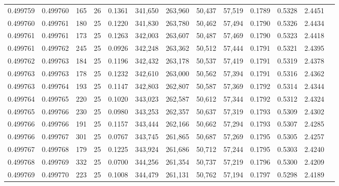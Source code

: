 \begin{tabular}{rrrrrrrrrrrrr}
0.499759 & 0.499760 & 165 &  26 &                                     0.1361 & 341,650 & 263,960 &  50,437 &  57,519 & 0.1789 & 0.5328 & 2.4451 \\
0.499760 & 0.499761 & 180 &  25 &                                     0.1220 & 341,830 & 263,780 &  50,462 &  57,494 & 0.1790 & 0.5326 & 2.4434 \\
0.499761 & 0.499761 & 173 &  25 &                                     0.1263 & 342,003 & 263,607 &  50,487 &  57,469 & 0.1790 & 0.5323 & 2.4418 \\
0.499761 & 0.499762 & 245 &  25 &                                     0.0926 & 342,248 & 263,362 &  50,512 &  57,444 & 0.1791 & 0.5321 & 2.4395 \\
0.499762 & 0.499763 & 184 &  25 &                                     0.1196 & 342,432 & 263,178 &  50,537 &  57,419 & 0.1791 & 0.5319 & 2.4378 \\
0.499763 & 0.499763 & 178 &  25 &                                     0.1232 & 342,610 & 263,000 &  50,562 &  57,394 & 0.1791 & 0.5316 & 2.4362 \\
0.499763 & 0.499764 & 193 &  25 &                                     0.1147 & 342,803 & 262,807 &  50,587 &  57,369 & 0.1792 & 0.5314 & 2.4344 \\
0.499764 & 0.499765 & 220 &  25 &                                     0.1020 & 343,023 & 262,587 &  50,612 &  57,344 & 0.1792 & 0.5312 & 2.4324 \\
0.499765 & 0.499766 & 230 &  25 &                                     0.0980 & 343,253 & 262,357 &  50,637 &  57,319 & 0.1793 & 0.5309 & 2.4302 \\
0.499766 & 0.499766 & 191 &  25 &                                     0.1157 & 343,444 & 262,166 &  50,662 &  57,294 & 0.1793 & 0.5307 & 2.4285 \\
0.499766 & 0.499767 & 301 &  25 &                                     0.0767 & 343,745 & 261,865 &  50,687 &  57,269 & 0.1795 & 0.5305 & 2.4257 \\
0.499767 & 0.499768 & 179 &  25 &                                     0.1225 & 343,924 & 261,686 &  50,712 &  57,244 & 0.1795 & 0.5303 & 2.4240 \\
0.499768 & 0.499769 & 332 &  25 &                                     0.0700 & 344,256 & 261,354 &  50,737 &  57,219 & 0.1796 & 0.5300 & 2.4209 \\
0.499769 & 0.499770 & 223 &  25 &                                     0.1008 & 344,479 & 261,131 &  50,762 &  57,194 & 0.1797 & 0.5298 & 2.4189 \\

\end{tabular}
